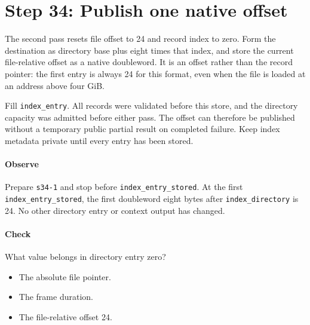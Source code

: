 \section{Step 34: Publish one native offset}
The second pass resets file offset to 24 and record index to zero. Form
the destination as directory base plus eight times that index, and store the
current file-relative offset as a native doubleword. It is an offset rather
than the record pointer: the first entry is always 24 for this format, even
when the file is loaded at an address above four GiB.

Fill \texttt{index\_entry}. All records were validated before this store,
and the directory capacity was admitted before either pass. The offset can
therefore be published without a temporary public partial result on completed
failure. Keep index metadata private until every entry has been stored.

\paragraph{Observe} Prepare \texttt{s34-1} and stop before
\texttt{index\_entry\_stored}. At the first \texttt{index\_entry\_stored}, the first
doubleword eight bytes after \texttt{index\_directory} is 24. No other
directory entry or context output has changed.

\paragraph{Check} What value belongs in directory entry zero?
\begin{itemize}
\item[A.] The absolute file pointer.
\item[B.] The frame duration.
\item[C.] The file-relative offset 24.
\end{itemize}
